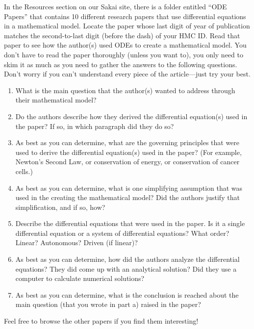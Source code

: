\documentclass[12pt,letterpaper]{hmcpset}
\begin{document}
\begin{problem}[5]
In the Resources section on our Sakai site, there is a folder entitled ``ODE Papers'' that contains 10 different research papers that use differential equations in a mathematical model.  Locate the paper whose last digit of year of publication matches the second-to-last digit (before the dash) of your HMC ID. Read that paper to see how the author(s) used ODEs to create a mathematical model. You don't have to read the paper thoroughly (unless you want to), you only need to skim it as much as you need to gather the answers to the following questions. Don't worry if you can't understand every piece of the article---just try your best.
\begin{enumerate}
\item What is the main question that the author(s) wanted to address through their mathematical model?
\item Do the authors describe how they derived the differential equation(s) used in the paper?  If so, in which paragraph did they do so?
\item As best as you can determine, what are the governing principles that were used to derive the differential equation(s) used in the paper?  (For example, Newton's Second Law, or conservation of energy, or conservation of cancer cells.)
\item As best as you can determine, what is one simplifying assumption that was used in the creating the mathematical model?  Did the authors justify that simplification, and if so, how?
\item Describe the differential equations that were used in the paper. Is it a single differential equation or a system of differential equations? What order? Linear? Autonomous? Driven (if linear)? 
\item As best as you can determine, how did the authors analyze the differential equations?  They did come up with an analytical solution?  Did they use a computer to calculate numerical solutions?
\item As best as you can determine, what is the conclusion is reached about the main question (that you wrote in part a) raised in the paper?
\end{enumerate}
Feel free to browse the other papers if you find them interesting!
\end{problem}

\newpage

\begin{solution}
  \vfill
\end{solution}
\end{document}
